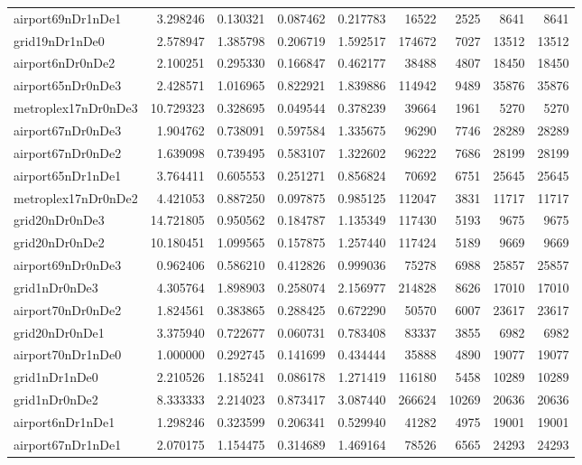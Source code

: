 \begin{longtable}{|l|r|r|r|r|r|r|r|r|}
airport69nDr1nDe1 & 3.298246 & 0.130321 & 0.087462 & 0.217783 & 16522 & 2525 & 8641 & 8641 \\
grid19nDr1nDe0 & 2.578947 & 1.385798 & 0.206719 & 1.592517 & 174672 & 7027 & 13512 & 13512 \\
airport6nDr0nDe2 & 2.100251 & 0.295330 & 0.166847 & 0.462177 & 38488 & 4807 & 18450 & 18450 \\
airport65nDr0nDe3 & 2.428571 & 1.016965 & 0.822921 & 1.839886 & 114942 & 9489 & 35876 & 35876 \\
metroplex17nDr0nDe3 & 10.729323 & 0.328695 & 0.049544 & 0.378239 & 39664 & 1961 & 5270 & 5270 \\
airport67nDr0nDe3 & 1.904762 & 0.738091 & 0.597584 & 1.335675 & 96290 & 7746 & 28289 & 28289 \\
airport67nDr0nDe2 & 1.639098 & 0.739495 & 0.583107 & 1.322602 & 96222 & 7686 & 28199 & 28199 \\
airport65nDr1nDe1 & 3.764411 & 0.605553 & 0.251271 & 0.856824 & 70692 & 6751 & 25645 & 25645 \\
metroplex17nDr0nDe2 & 4.421053 & 0.887250 & 0.097875 & 0.985125 & 112047 & 3831 & 11717 & 11717 \\
grid20nDr0nDe3 & 14.721805 & 0.950562 & 0.184787 & 1.135349 & 117430 & 5193 & 9675 & 9675 \\
grid20nDr0nDe2 & 10.180451 & 1.099565 & 0.157875 & 1.257440 & 117424 & 5189 & 9669 & 9669 \\
airport69nDr0nDe3 & 0.962406 & 0.586210 & 0.412826 & 0.999036 & 75278 & 6988 & 25857 & 25857 \\
grid1nDr0nDe3 & 4.305764 & 1.898903 & 0.258074 & 2.156977 & 214828 & 8626 & 17010 & 17010 \\
airport70nDr0nDe2 & 1.824561 & 0.383865 & 0.288425 & 0.672290 & 50570 & 6007 & 23617 & 23617 \\
grid20nDr0nDe1 & 3.375940 & 0.722677 & 0.060731 & 0.783408 & 83337 & 3855 & 6982 & 6982 \\
airport70nDr1nDe0 & 1.000000 & 0.292745 & 0.141699 & 0.434444 & 35888 & 4890 & 19077 & 19077 \\
grid1nDr1nDe0 & 2.210526 & 1.185241 & 0.086178 & 1.271419 & 116180 & 5458 & 10289 & 10289 \\
grid1nDr0nDe2 & 8.333333 & 2.214023 & 0.873417 & 3.087440 & 266624 & 10269 & 20636 & 20636 \\
airport6nDr1nDe1 & 1.298246 & 0.323599 & 0.206341 & 0.529940 & 41282 & 4975 & 19001 & 19001 \\
airport67nDr1nDe1 & 2.070175 & 1.154475 & 0.314689 & 1.469164 & 78526 & 6565 & 24293 & 24293 \\

\end{longtable}

